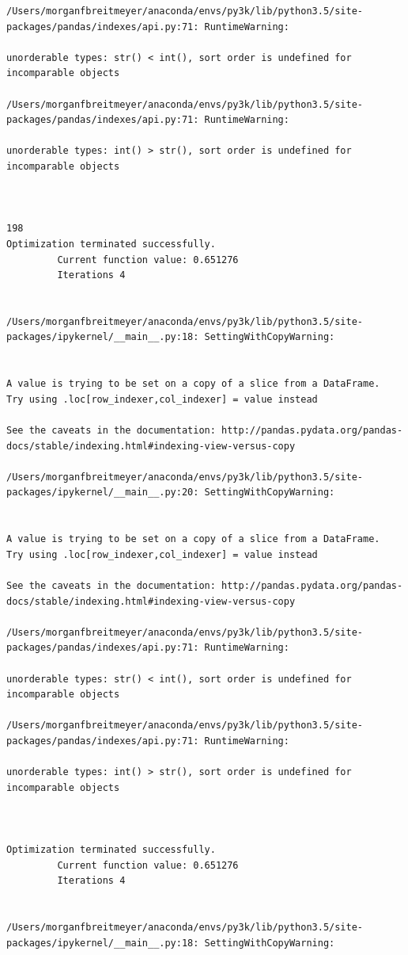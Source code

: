 \begin{lstlisting}
/Users/morganfbreitmeyer/anaconda/envs/py3k/lib/python3.5/site-packages/pandas/indexes/api.py:71: RuntimeWarning:

unorderable types: str() < int(), sort order is undefined for incomparable objects

/Users/morganfbreitmeyer/anaconda/envs/py3k/lib/python3.5/site-packages/pandas/indexes/api.py:71: RuntimeWarning:

unorderable types: int() > str(), sort order is undefined for incomparable objects



198
Optimization terminated successfully.
         Current function value: 0.651276
         Iterations 4


/Users/morganfbreitmeyer/anaconda/envs/py3k/lib/python3.5/site-packages/ipykernel/__main__.py:18: SettingWithCopyWarning:


A value is trying to be set on a copy of a slice from a DataFrame.
Try using .loc[row_indexer,col_indexer] = value instead

See the caveats in the documentation: http://pandas.pydata.org/pandas-docs/stable/indexing.html#indexing-view-versus-copy

/Users/morganfbreitmeyer/anaconda/envs/py3k/lib/python3.5/site-packages/ipykernel/__main__.py:20: SettingWithCopyWarning:


A value is trying to be set on a copy of a slice from a DataFrame.
Try using .loc[row_indexer,col_indexer] = value instead

See the caveats in the documentation: http://pandas.pydata.org/pandas-docs/stable/indexing.html#indexing-view-versus-copy

/Users/morganfbreitmeyer/anaconda/envs/py3k/lib/python3.5/site-packages/pandas/indexes/api.py:71: RuntimeWarning:

unorderable types: str() < int(), sort order is undefined for incomparable objects

/Users/morganfbreitmeyer/anaconda/envs/py3k/lib/python3.5/site-packages/pandas/indexes/api.py:71: RuntimeWarning:

unorderable types: int() > str(), sort order is undefined for incomparable objects



Optimization terminated successfully.
         Current function value: 0.651276
         Iterations 4


/Users/morganfbreitmeyer/anaconda/envs/py3k/lib/python3.5/site-packages/ipykernel/__main__.py:18: SettingWithCopyWarning:



\end{lstlisting}
